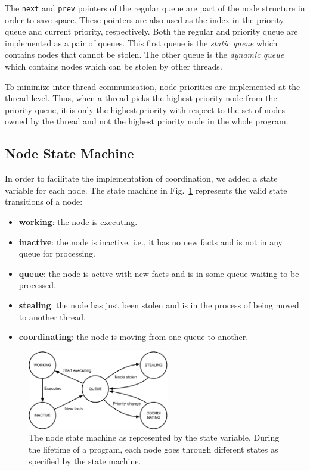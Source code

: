 The \texttt{next} and \texttt{prev} pointers of the regular queue are part of
the node structure in order to save space. These pointers are also used as the
index in the priority queue and current priority, respectively. Both the regular
and priority queue are implemented as a pair of queues.  This first queue is the
\emph{static queue} which contains nodes that cannot be stolen.  The other queue
is the \emph{dynamic queue} which contains nodes which can be stolen by other
threads.

To minimize inter-thread communication, node priorities are implemented at the
thread level. Thus, when a thread picks the highest priority node from the
priority queue, it is only the highest priority with respect to the set of nodes
owned by the thread and not the highest priority node in the whole program.  

\subsection{Node State Machine}\label{sec:node_state_machine}

In order to facilitate the implementation of coordination, we added a state
variable for each node. The state machine in
Fig.~\ref{fig:implementation:node_states} represents the valid state transitions
of a node:

\begin{itemize}
   \item \textbf{working}: the node is executing.
   \item \textbf{inactive}: the node is inactive, i.e., it has no new facts and is not in any
   queue for processing.
   \item \textbf{queue}: the node is active with new facts and is in some queue waiting
   to be processed.
   \item \textbf{stealing}: the node has just been stolen and is in the process of being
   moved to another thread.
   \item \textbf{coordinating}: the node is moving from one queue to another.
\end{itemize}

\begin{figure}[ht]
   \centering
   \includegraphics[width=0.55\textwidth]{figures/implementation/node_states.pdf}
   \caption{The node state machine as represented by the state variable. During
      the lifetime of a program, each node goes through different states as
      specified by the state machine.}
   \label{fig:implementation:node_states}
\end{figure}

